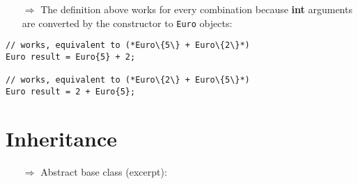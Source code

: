 \documentclass[10pt]{article}
\begin{document}
\begin{enumerate}
\item[$\Rightarrow$] The definition above works for every combination because \textbf{int} arguments are converted by the constructor to \texttt{Euro} objects:
\end{enumerate}
\begin{lstlisting}
// works, equivalent to (*Euro\{5\} + Euro\{2\}*)
Euro result = Euro{5} + 2; 

// works, equivalent to (*Euro\{2\} + Euro\{5\}*)
Euro result = 2 + Euro{5}; 
\end{lstlisting}
%
%
\section{Inheritance}
\small
\begin{enumerate}
\item[$\Rightarrow$] Abstract base class (excerpt):
\end{enumerate}
\end{document}
